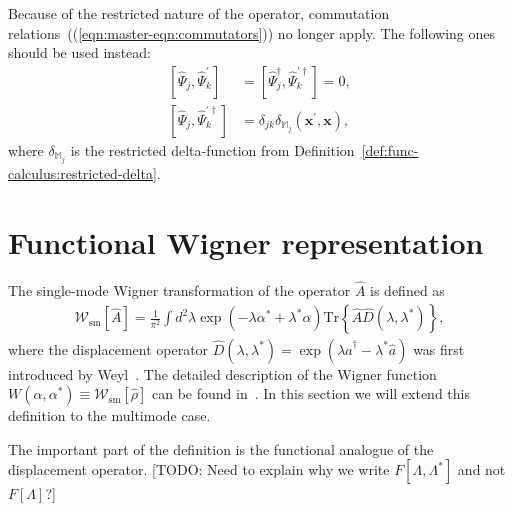 \documentclass[12pt,aip,jmp,amssymb,amsmath]{revtex4-1}
\begin{document}
Because of the restricted nature of the operator, commutation relations~((\ref{eqn:master-eqn:commutators})) no longer apply.
The following ones should be used instead:
\begin{equation}\label{eqn:func-operators:restricted-commutators}\begin{split}
    \left[ \hat{\Psi}_j, \hat{\Psi}_k^\prime \right]
    & = \left[ \hat{\Psi}_j^\dagger, \hat{\Psi}_k^{\prime\dagger} \right] = 0, \\
    \left[ \hat{\Psi}_j, \hat{\Psi}_k^{\prime\dagger} \right]
    & = \delta_{jk} \delta_{\mathbb{M}_j}(\boldsymbol{x}^\prime, \boldsymbol{x}),
\end{split}\end{equation}
where $\delta_{\mathbb{M}_j}$ is the restricted delta-function from Definition~\ref{def:func-calculus:restricted-delta}.



\section{Functional Wigner representation}

The single-mode Wigner transformation of the operator $\hat{A}$ is defined as
\begin{equation}\begin{split}
    \mathcal{W}_{\mathrm{sm}}[\hat{A}]
    = \frac{1}{\pi^2} \int d^2 \lambda \exp(-\lambda \alpha^* + \lambda^* \alpha)
        \mathrm{Tr} \left\{ \hat{A} \hat{D}(\lambda, \lambda^*) \right\},
\end{split}\end{equation}
where the displacement operator $\hat{D}(\lambda, \lambda^*) = \exp(\lambda \hat{a}^\dagger - \lambda^* \hat{a})$ was first introduced by Weyl~\cite{Weyl1950}.
The detailed description of the Wigner function $W(\alpha, \alpha^*) \equiv \mathcal{W}_{\mathrm{sm}}[\hat{\rho}]$ can be found in~\cite{Gardiner2004}.
In this section we will extend this definition to the multimode case.

The important part of the definition is the functional analogue of the displacement operator.
[TODO: Need to explain why we write $F[\Lambda, \Lambda^*]$ and not $F[\Lambda]$?]
\end{document}

